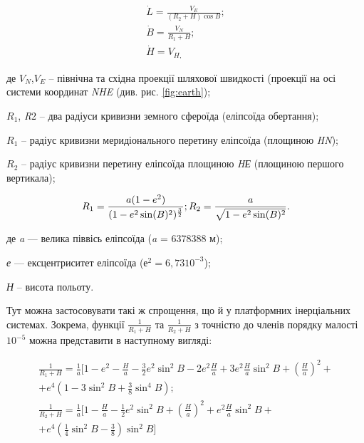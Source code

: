 \[\begin{array}{l} 
{\dot{L}=\frac{V_{E} }{(R_{2} +H)\cos B} ;} \\ 
{\dot{B}=\frac{V_{N} }{R_{1} +H} ;} \\ 
{\dot{H}=V_{H,} } 
\end{array}\] 

\begin{ESKDexplanation}
\item де  $V_{N}$,$V_{E}$ -- північна та східна проекції шляхової швидкості 
(проекції на осі  системи координат \textit{NHE}  (див. рис. \ref{fig:earth}); 
\item $R_1$, \textit{R}2 -- два радіуси кривизни земного сфероїда (еліпсоїда обертання); 
\item $R_1$ -- радіус кривизни меридіонального перетину еліпсоїда (площиною \textit{HN}); 
\item $R_2$  -- радіус кривизни перетину еліпсоїда площиною \textit{HЕ} (площиною першого вертикала); 
\end{ESKDexplanation}



\[
R_{1} =\frac{a(1-e^{2})}{(1-e^{2} \sin(B)^{2})^{\frac{3}{2}} }; \,\\
R_{2} =\frac{a}{\sqrt{1-e^{2} \sin(B)^{2} } }.
\] 

\begin{ESKDexplanation}
\item де\textit{ a}  --- велика піввісь  еліпсоїда (\textit{a }=  6378388 м); 
\item \textit{е} --- ексцентриситет еліпсоїда  ($е^2 = 6,73 10^{-3}$);  
\item \textit{Н}  -- висота 
польоту. 
\end{ESKDexplanation}

Тут можна застосовувати такі ж спрощення, що й у платформних інерціальних системах. 
Зокрема, функції   $\frac{1}{R_{1} +H}$ та $\frac{1}{R_{2} +H} $ 
з точністю до членів порядку малості $10^{-5}$ можна представити 
в наступному вигляді:

\[\begin{array}{l} 
{\frac{1}{R_{1} +H} =\frac{1}{a} [1-e^{2} -\frac{H}{a} 
-\frac{3}{2} e^{2} \sin ^{2} B-2e^{2} \frac{H}{a} +3e^{2} \frac{H}{a} \sin 
^{2} B + (\frac{H}{a} )^{2} +}\\
{+e^{4} (1-3\sin ^{2} B+\frac{3}{8}\sin ^{4} B);} \\ 

{\frac{1}{R_{2} +H} =\frac{1}{a}[1-\frac{H}{a} 
-\frac{1}{2} e^{2} \sin ^{2} B+(\frac{H}{a})^{2} +e^{2} \frac{H}{a} 
\sin ^{2} B+} \\ 
{+e^{4}(\frac{1}{4} \sin ^{2} B-\frac{3}{8})\sin ^{2} B]} 
\end{array}\] 

